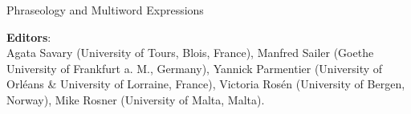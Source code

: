 {\large Phraseology and Multiword Expressions}

\bigskip

\textbf{Editors}:\\
Agata Savary (University of Tours, Blois, France), Manfred Sailer (Goethe University of Frankfurt a. M., Germany), Yannick Parmentier (University of Orléans \& University of Lorraine, France), Victoria Rosén (University of Bergen, Norway), Mike Rosner (University of Malta, Malta).

\bigskip




